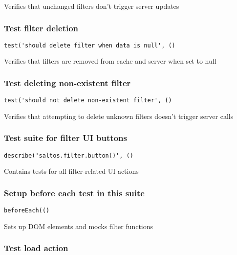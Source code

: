 \documentclass[a4paper]{article}
\begin{document}
Verifies that unchanged filters don't trigger server updates

\hypertarget{toc162}{}
\subsubsection{Test filter deletion}

\begin{lstlisting}
test('should delete filter when data is null', ()
\end{lstlisting}

Verifies that filters are removed from cache and server when set to null

\hypertarget{toc163}{}
\subsubsection{Test deleting non-existent filter}

\begin{lstlisting}
test('should not delete non-existent filter', ()
\end{lstlisting}

Verifies that attempting to delete unknown filters doesn't trigger server calls

\hypertarget{toc164}{}
\subsubsection{Test suite for filter UI buttons}

\begin{lstlisting}
describe('saltos.filter.button()', ()
\end{lstlisting}

Contains tests for all filter-related UI actions

\hypertarget{toc165}{}
\subsubsection{Setup before each test in this suite}

\begin{lstlisting}
beforeEach(()
\end{lstlisting}

Sets up DOM elements and mocks filter functions

\hypertarget{toc166}{}
\subsubsection{Test load action}
\end{document}
